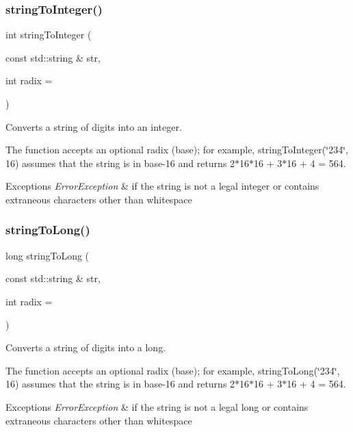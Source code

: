 \subsubsection{\texorpdfstring{string\+To\+Integer()}{stringToInteger()}}
{\footnotesize\ttfamily int string\+To\+Integer (\begin{DoxyParamCaption}\item[{const std\+::string \&}]{str,  }\item[{int}]{radix = {} }\end{DoxyParamCaption})}



Converts a string of digits into an integer. 

The function accepts an optional radix (base); for example, string\+To\+Integer(\char`\"{}234\char`\"{}, 16) assumes that the string is in base-\/16 and returns 2$\ast$16$\ast$16 + 3$\ast$16 + 4 = 564. 
\begin{DoxyExceptions}{Exceptions}
{\em Error\+Exception} & if the string is not a legal integer or contains extraneous characters other than whitespace \\
\hline
\end{DoxyExceptions}
\mbox{\label{namespacesgl_1_1priv_1_1strlib_a1e7f514d7bb739231262e4a267b53184}} 
\subsubsection{\texorpdfstring{string\+To\+Long()}{stringToLong()}}
{\footnotesize\ttfamily long string\+To\+Long (\begin{DoxyParamCaption}\item[{const std\+::string \&}]{str,  }\item[{int}]{radix = {} }\end{DoxyParamCaption})}



Converts a string of digits into a long. 

The function accepts an optional radix (base); for example, string\+To\+Long(\char`\"{}234\char`\"{}, 16) assumes that the string is in base-\/16 and returns 2$\ast$16$\ast$16 + 3$\ast$16 + 4 = 564. 
\begin{DoxyExceptions}{Exceptions}
{\em Error\+Exception} & if the string is not a legal long or contains extraneous characters other than whitespace \\
\hline
\end{DoxyExceptions}
\mbox{\label{namespacesgl_1_1priv_1_1strlib_a6a7701384dec7dbee60264b792e613c7}} 
